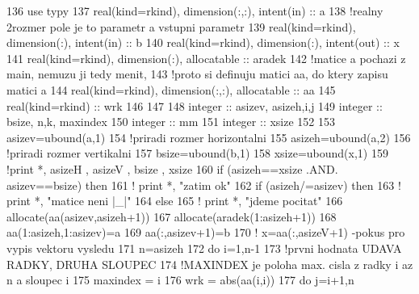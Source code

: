 \begin{DoxyCode}
136     \textcolor{keywordtype}{use }typy
137     \textcolor{keywordtype}{real(kind=rkind)}, \textcolor{keywordtype}{dimension(:,:)}, \textcolor{keywordtype}{intent(in)} :: a
138     \textcolor{comment}{!realny 2rozmer pole je to parametr a vstupni parametr
}
139     \textcolor{keywordtype}{real(kind=rkind)}, \textcolor{keywordtype}{dimension(:)}, \textcolor{keywordtype}{intent(in)} :: b
140     \textcolor{keywordtype}{real(kind=rkind)}, \textcolor{keywordtype}{dimension(:)}, \textcolor{keywordtype}{intent(out)} :: x
141     \textcolor{keywordtype}{real(kind=rkind)}, \textcolor{keywordtype}{dimension(:)}, \textcolor{keywordtype}{allocatable} :: aradek
142     \textcolor{comment}{!matice a pochazi z main, nemuzu ji tedy menit,
}
143     \textcolor{comment}{!proto si definuju matici aa, do ktery zapisu matici a
}
144     \textcolor{keywordtype}{real(kind=rkind)}, \textcolor{keywordtype}{dimension(:,:)}, \textcolor{keywordtype}{allocatable} :: aa
145     \textcolor{keywordtype}{real(kind=rkind)} :: wrk
146 
147 
148     \textcolor{keywordtype}{integer} :: asizev, asizeh,i,j
149     \textcolor{keywordtype}{integer} :: bsize, n,k, maxindex
150     \textcolor{keywordtype}{integer} :: mm
151     \textcolor{keywordtype}{integer} :: xsize
152 
153     asizev=ubound(a,1)
154     \textcolor{comment}{!priradi rozmer horizontalni 
}
155     asizeh=ubound(a,2)
156     \textcolor{comment}{!priradi rozmer vertikalni 
}
157     bsize=ubound(b,1)
158     xsize=ubound(x,1)
159     \textcolor{comment}{!print *, asizeH , asizeV , bsize , xsize
}
160     \textcolor{keywordflow}{if} (asizeh==xsize .AND. asizev==bsize) then
161       \textcolor{comment}{!    print *, "zatim ok"
}
162       \textcolor{keywordflow}{if} (asizeh/=asizev) then
163         \textcolor{comment}{!   print *, "matice neni |\_|"
}
164       \textcolor{keywordflow}{else} 
165         \textcolor{comment}{!    print *, "jdeme pocitat"
}
166         \textcolor{keyword}{allocate}(aa(asizev,asizeh+1))
167         \textcolor{keyword}{allocate}(aradek(1:asizeh+1))
168         aa(1:asizeh,1:asizev)=a
169         aa(:,asizev+1)=b
170         \textcolor{comment}{!    x=aa(:,asizeV+1) -pokus pro vypis vektoru vysledu
}
171         n=asizeh
172         \textcolor{keywordflow}{do} i=1,n-1
173           \textcolor{comment}{!prvni hodnata UDAVA RADKY, DRUHA SLOUPEC
}
174           \textcolor{comment}{!MAXINDEX je poloha max. cisla  z radky i az n a sloupec i
}
175           maxindex = i
176           wrk = abs(aa(i,i))
177           \textcolor{keywordflow}{do} j=i+1,n

\end{DoxyCode}
